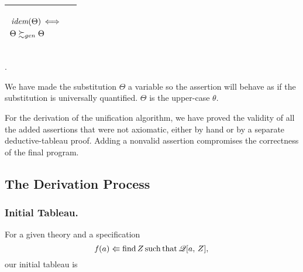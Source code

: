 \documentclass[runningheads]{llncs}
\DeclareMathOperator{\uf}{\emph{f}\,}
\DeclareMathOperator{\uiff}{\iff}
\DeclareMathOperator{\idem}{\emph{idem}}
\begin{document}
\noindent  
 \begin{center}
\begin{tabular}{T}
 \hline
\begin{center}
{\begin{align*}
&\idem(\Theta) \uiff   \\   
&\Theta \moregen \Theta
\end{align*}}
\end{center}
      &  & \\
\hline
\end{tabular}.
\end{center}
\noindent  We have made the substitution $\Theta$ a variable so the assertion will behave as if the substitution is universally quantified. $\Theta$ is the upper-case $\theta$.

For the derivation of the unification algorithm, we have proved the validity of all the added assertions that were not axiomatic, either by hand or by a separate deductive-tableau proof.  Adding a nonvalid assertion compromises the correctness of the final program.

  
\subsection{The Derivation Process}
\subsubsection{Initial Tableau.} For a given theory and a specification 
  \begin{equation*} \uf(a) \Lleftarrow \operatorname{find}\var{Z} \operatorname{such} \operatorname{that} \mathscr{Q}[a, \,\var{Z}],
  \end{equation*}
our initial tableau is
\end{document}
